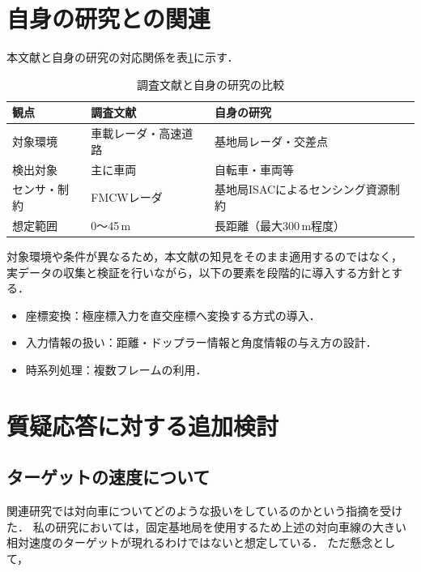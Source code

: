 \documentclass[a4paper,10.5pt,dvipdfmx]{jsarticle}
\begin{document}
\section{自身の研究との関連}
\label{sec:relation}

本文献と自身の研究の対応関係を表\ref{tab:relation}に示す．

\begin{table}[htbp]
  \centering
  \caption{調査文献と自身の研究の比較}
  \label{tab:relation}
  \begin{tabular}{lll}
    \toprule
    観点 & 調査文献 & 自身の研究 \\
    \midrule
    対象環境 & 車載レーダ・高速道路 & 基地局レーダ・交差点 \\
    検出対象 & 主に車両 & 自転車・車両等 \\
    センサ・制約 & FMCWレーダ & 基地局ISACによるセンシング資源制約 \\
    想定範囲 & 0〜45\,m & 長距離（最大300\,m程度） \\
    \bottomrule
  \end{tabular}
\end{table}

対象環境や条件が異なるため，本文献の知見をそのまま適用するのではなく，
実データの収集と検証を行いながら，以下の要素を段階的に導入する方針とする．

\begin{itemize}
  \item 座標変換：極座標入力を直交座標へ変換する方式の導入．
  \item 入力情報の扱い：距離・ドップラー情報と角度情報の与え方の設計．
  \item 時系列処理：複数フレームの利用．
\end{itemize}

\section{質疑応答に対する追加検討}
\label{sec:qa}


\subsection{ターゲットの速度について}
関連研究では対向車についてどのような扱いをしているのかという指摘を受けた．
私の研究においては，固定基地局を使用するため上述の対向車線の大きい相対速度のターゲットが現れるわけではないと想定している．
ただ懸念として，
\end{document}
